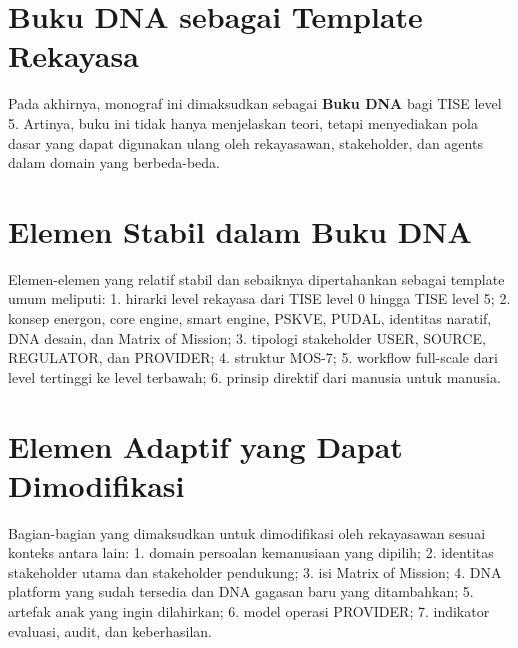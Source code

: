 \documentclass[
  letterpaper,
  DIV=11,
  numbers=noendperiod]{scrreprt}
\begin{document}
\section*{Buku DNA sebagai Template
Rekayasa}\label{buku-dna-sebagai-template-rekayasa}


Pada akhirnya, monograf ini dimaksudkan sebagai \textbf{Buku DNA} bagi
TISE level 5. Artinya, buku ini tidak hanya menjelaskan teori, tetapi
menyediakan pola dasar yang dapat digunakan ulang oleh rekayasawan,
stakeholder, dan agents dalam domain yang berbeda-beda.

\section*{Elemen Stabil dalam Buku
DNA}\label{elemen-stabil-dalam-buku-dna}


Elemen-elemen yang relatif stabil dan sebaiknya dipertahankan sebagai
template umum meliputi: 1. hirarki level rekayasa dari TISE level 0
hingga TISE level 5; 2. konsep energon, core engine, smart engine,
PSKVE, PUDAL, identitas naratif, DNA desain, dan Matrix of Mission; 3.
tipologi stakeholder USER, SOURCE, REGULATOR, dan PROVIDER; 4. struktur
MOS-7; 5. workflow full-scale dari level tertinggi ke level terbawah; 6.
prinsip direktif dari manusia untuk manusia.

\section*{Elemen Adaptif yang Dapat
Dimodifikasi}\label{elemen-adaptif-yang-dapat-dimodifikasi}


Bagian-bagian yang dimaksudkan untuk dimodifikasi oleh rekayasawan
sesuai konteks antara lain: 1. domain persoalan kemanusiaan yang
dipilih; 2. identitas stakeholder utama dan stakeholder pendukung; 3.
isi Matrix of Mission; 4. DNA platform yang sudah tersedia dan DNA
gagasan baru yang ditambahkan; 5. artefak anak yang ingin dilahirkan; 6.
model operasi PROVIDER; 7. indikator evaluasi, audit, dan keberhasilan.

\end{document}
